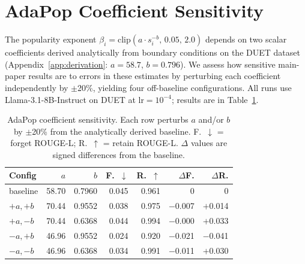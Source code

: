 \section{AdaPop Coefficient Sensitivity}
\label{app:coef_sensitivity}

The popularity exponent $\beta_i = \mathrm{clip}(a \cdot s_i^{-b},\, 0.05,\, 2.0)$ depends on two scalar coefficients derived analytically from boundary conditions on the DUET dataset (Appendix~\ref{app:derivation}: $a{=}58.7$, $b{=}0.796$). We assess how sensitive main-paper results are to errors in these estimates by perturbing each coefficient independently by $\pm$20\%, yielding four off-baseline configurations. All runs use Llama-3.1-8B-Instruct on DUET at $\text{lr}=10^{-4}$; results are in Table~\ref{tab:coef_sensitivity}.

\begin{table}[ht]
\centering
\footnotesize
\setlength{\tabcolsep}{4pt}
\begin{tabular}{|l|r|r|r|r|r|r|}
\hline
\textbf{Config} & $a$ & $b$ & \textbf{F.}~$\downarrow$ & \textbf{R.}~$\uparrow$ & $\Delta$\textbf{F.} & $\Delta$\textbf{R.} \\ \hline
baseline & 58.70 & 0.7960 & 0.045 & 0.961 & 0 & 0 \\ \hline
$+a,+b$  & 70.44 & 0.9552 & 0.038 & 0.975 & $-$0.007 & $+$0.014 \\ \hline
$+a,-b$  & 70.44 & 0.6368 & 0.044 & 0.994 & $-$0.000 & $+$0.033 \\ \hline
$-a,+b$  & 46.96 & 0.9552 & 0.024 & 0.920 & $-$0.021 & $-$0.041 \\ \hline
$-a,-b$  & 46.96 & 0.6368 & 0.034 & 0.991 & $-$0.011 & $+$0.030 \\ \hline
\end{tabular}
\caption{AdaPop coefficient sensitivity. Each row perturbs $a$ and/or $b$ by $\pm$20\% from the analytically derived baseline. F.~$\downarrow$ = forget ROUGE-L; R.~$\uparrow$ = retain ROUGE-L. $\Delta$ values are signed differences from the baseline.}
\label{tab:coef_sensitivity}
\end{table}

